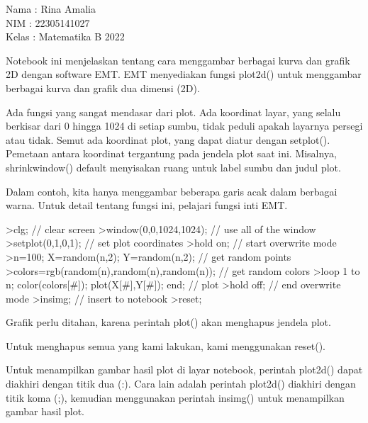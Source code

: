 \documentclass[a4paper,10pt]{article}
\begin{document}
\begin{eulernotebook}
\begin{eulercomment}
Nama  : Rina Amalia\\
NIM   : 22305141027\\
Kelas : Matematika B 2022

\begin{eulercomment}
\begin{eulercomment}
Notebook ini menjelaskan tentang cara menggambar berbagai kurva dan
grafik 2D dengan software EMT. EMT menyediakan fungsi plot2d() untuk
menggambar berbagai kurva dan grafik dua dimensi (2D).\\
\end{eulercomment}
\begin{eulercomment}
Ada fungsi yang sangat mendasar dari plot. Ada koordinat layar, yang
selalu berkisar dari 0 hingga 1024 di setiap sumbu, tidak peduli
apakah layarnya persegi atau tidak. Semut ada koordinat plot, yang
dapat diatur dengan setplot(). Pemetaan antara koordinat tergantung
pada jendela plot saat ini. Misalnya, shrinkwindow() default
menyisakan ruang untuk label sumbu dan judul plot.

Dalam contoh, kita hanya menggambar beberapa garis acak dalam berbagai
warna. Untuk detail tentang fungsi ini, pelajari fungsi inti EMT.
\end{eulercomment}
\begin{eulerprompt}
>clg; // clear screen
>window(0,0,1024,1024); // use all of the window
>setplot(0,1,0,1); // set plot coordinates
>hold on; // start overwrite mode
>n=100; X=random(n,2); Y=random(n,2);  // get random points
>colors=rgb(random(n),random(n),random(n)); // get random colors
>loop 1 to n; color(colors[#]); plot(X[#],Y[#]); end; // plot
>hold off; // end overwrite mode
>insimg; // insert to notebook
>reset;
\end{eulerprompt}
\begin{eulercomment}
Grafik perlu ditahan, karena perintah plot() akan menghapus jendela
plot.

Untuk menghapus semua yang kami lakukan, kami menggunakan reset().

Untuk menampilkan gambar hasil plot di layar notebook, perintah
plot2d() dapat diakhiri dengan titik dua (:). Cara lain adalah
perintah plot2d() diakhiri dengan titik koma (;), kemudian menggunakan
perintah insimg() untuk menampilkan gambar hasil plot.


\end{eulercomment}
\end{eulercomment}
\end{eulercomment}
\end{eulernotebook}
\end{document}
